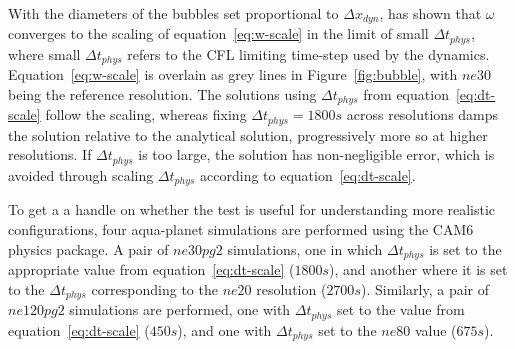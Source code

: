 \documentclass[draft,linenumbers]{agujournal}
\begin{document}
With the diameters of the bubbles set proportional to $\Delta x_{dyn}$, \cite{HR2018JAMES} has shown that $\omega$ converges to the scaling of equation~\eqref{eq:w-scale} in the limit of small $\Delta t_{phys}$, where small $\Delta t_{phys}$ refers to the CFL limiting time-step used by the dynamics. Equation~\eqref{eq:w-scale} is overlain as grey lines in Figure~\ref{fig:bubble}, with $ne30$ being the reference resolution. The solutions using $\Delta t_{phys}$ from equation~\eqref{eq:dt-scale} follow the scaling, whereas fixing $\Delta t_{phys} = 1800s$ across resolutions damps the solution relative to the analytical solution, progressively more so at higher resolutions. If $\Delta t_{phys}$ is too large, the solution has non-negligible error, which is avoided through scaling $\Delta t_{phys}$ according to equation~\eqref{eq:dt-scale}.

To get a a handle on whether the test is useful for understanding more realistic configurations, four aqua-planet simulations are performed using the CAM6 physics package. A pair of $ne30pg2$ simulations, one in which $\Delta t_{phys}$ is set to the appropriate value from equation~\eqref{eq:dt-scale} ($1800s$), and another where it is set to the $\Delta t_{phys}$ corresponding to the $ne20$ resolution ($2700s$). Similarly, a pair of $ne120pg2$ simulations are performed, one with $\Delta t_{phys}$ set to the value from equation~\eqref{eq:dt-scale} ($450s$), and one with $\Delta t_{phys}$ set to the $ne80$ value ($675s$). 
\end{document}

